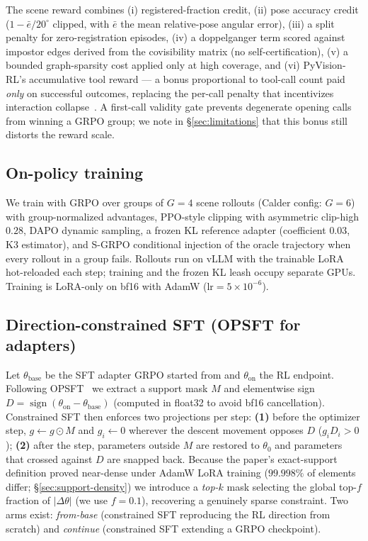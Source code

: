 \documentclass[10pt,twocolumn,letterpaper]{article}
\begin{document}
The scene reward combines (i) registered-fraction credit, (ii) pose
accuracy credit ($1 - \bar{e}/20^\circ$ clipped, with $\bar{e}$ the mean
relative-pose angular error), (iii) a split penalty for zero-registration
episodes, (iv) a doppelganger term scored against impostor edges derived
from the covisibility matrix (no self-certification), (v) a bounded
graph-sparsity cost applied only at high coverage, and (vi) PyVision-RL's
accumulative tool reward — a bonus proportional to tool-call count paid
\emph{only} on successful outcomes, replacing the per-call penalty that
incentivizes interaction collapse~\cite{pyvisionrl}. A first-call validity
gate prevents degenerate opening calls from winning a GRPO group; we note
in \S\ref{sec:limitations} that this bonus still distorts the reward scale.

\subsection{On-policy training}
\label{sec:grpo}

We train with GRPO over groups of $G{=}4$ scene rollouts
(Calder config: $G{=}6$) with group-normalized advantages, PPO-style
clipping with asymmetric clip-high $0.28$, DAPO dynamic sampling, a frozen
KL reference adapter (coefficient $0.03$, K3 estimator), and S-GRPO
conditional injection of the oracle trajectory when every rollout in a
group fails. Rollouts run on vLLM with the trainable LoRA hot-reloaded
each step; training and the frozen KL leash occupy separate GPUs.
Training is LoRA-only on bf16 with AdamW ($\mathrm{lr}{=}5\!\times\!10^{-6}$).

\subsection{Direction-constrained SFT (OPSFT for adapters)}
\label{sec:opsft}

Let $\theta_{\mathrm{base}}$ be the SFT adapter GRPO started from and
$\theta_{\mathrm{on}}$ the RL endpoint. Following OPSFT~\cite{opsft} we
extract a support mask $M$ and elementwise sign
$D = \operatorname{sign}(\theta_{\mathrm{on}}-\theta_{\mathrm{base}})$
(computed in float32 to avoid bf16 cancellation). Constrained SFT then
enforces two projections per step: \textbf{(1)} before the optimizer step,
$g \leftarrow g \odot M$ and $g_i \leftarrow 0$ wherever the descent
movement opposes $D$ ($g_i D_i > 0$); \textbf{(2)} after the step,
parameters outside $M$ are restored to $\theta_0$ and parameters that
crossed against $D$ are snapped back. Because the paper's exact-support
definition proved near-dense under AdamW LoRA training
($99.998\%$ of elements differ; \S\ref{sec:support-density}) we introduce
a \emph{top-$k$} mask selecting the global top-$f$ fraction of
$|\Delta\theta|$ (we use $f{=}0.1$), recovering a genuinely sparse
constraint. Two arms exist: \emph{from-base} (constrained SFT reproducing
the RL direction from scratch) and \emph{continue} (constrained SFT
extending a GRPO checkpoint).
\end{document}
